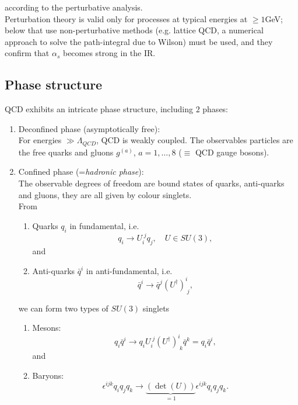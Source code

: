 







according to the perturbative analysis.
\\
Perturbation theory is valid only for processes at typical energies at $\geq 1$GeV; below that use non-perturbative methods (e.g. lattice QCD, a numerical approach to solve the path-integral due to Wilson) must be used, and they confirm that $\alpha_s$ becomes strong in the IR.
\subsection{Phase structure}
QCD exhibits an intricate phase structure, including $2$ phases:
\begin{enumerate}
\item Deconfined phase (asymptotically free):\\
For energies $\gg \Lambda_{QCD}$, QCD is weakly coupled. The observables particles are the free quarks and gluons $g^{(a)}$, $a=1,\dots,8$ ($\equiv$ QCD gauge bosons).
\item Confined phase (=\emph{hadronic phase}):\\
The observable degrees of freedom are bound states of quarks, anti-quarks and gluons, they are all given by colour singlets.\\
From
\begin{enumerate}
	\item Quarks $q_i$ in fundamental, i.e.
	\begin{equation}
		q_i \rightarrow U^{\;j}_i q_j,\quad U\in SU(3),
	\end{equation}
	and
	\item Anti-quarks $\bar{q}^i$ in anti-fundamental, i.e.
	\begin{equation}
		\bar{q}^i \rightarrow \bar{q}^j (U^\dagger)^i_{\;j},
	\end{equation}
\end{enumerate}
we can form two types of $SU(3)$ singlets
\begin{enumerate}
	\item Mesons:
	\begin{equation}
		q_i \bar{ q}^i \rightarrow q_i U^{\;j}_i (U^\dagger)^i_{\;k} \bar{q}^k = q_i \bar{q}^i,
	\end{equation}
	and
	\item Baryons:
	\begin{equation}
		\epsilon^{ijk} q_i q_j q_k \rightarrow \underbrace{(\det(U))}_{=1} \epsilon^{ijk} q_i q_j q_k.
	\end{equation}
\end{enumerate}
\end{enumerate}

